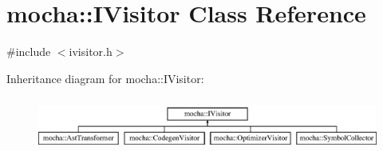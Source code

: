 \hypertarget{classmocha_1_1_i_visitor}{
\section{mocha::IVisitor Class Reference}
\label{classmocha_1_1_i_visitor}
}


{\ttfamily \#include $<$ivisitor.h$>$}

Inheritance diagram for mocha::IVisitor:\begin{figure}[H]
\begin{center}
\leavevmode
\includegraphics[height=1.806452cm]{classmocha_1_1_i_visitor}
\end{center}
\end{figure}

